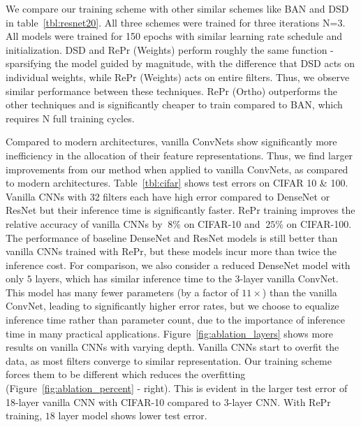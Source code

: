 We compare our training scheme with other similar schemes like BAN and DSD in table~\ref{tbl:resnet20}.
All three schemes were trained for three iterations \ie N=3. 
All models were trained for 150 epochs with similar learning rate schedule and initialization.
DSD and RePr (Weights) perform roughly the same function - sparsifying the model guided by magnitude, with the difference that DSD acts on individual weights, while RePr (Weights) acts on entire filters.
Thus, we observe similar performance between these techniques.
RePr (Ortho) outperforms the other techniques and is significantly cheaper to train compared to BAN, which requires N full training cycles.

Compared to modern architectures, vanilla ConvNets show significantly more inefficiency in the allocation of their feature representations. 
Thus, we find larger improvements from our method when applied to vanilla ConvNets, as compared to modern architectures. 
Table~\ref{tbl:cifar} shows test errors on CIFAR 10 \& 100. 
Vanilla CNNs with 32 filters each have high error compared to DenseNet or ResNet but their inference time is significantly faster. 
RePr training improves the relative accuracy of vanilla CNNs by $~8\%$ on CIFAR-10 and $~25\%$ on CIFAR-100.
The performance of baseline DenseNet and ResNet models is still better than vanilla CNNs trained with RePr, but these models incur more than twice the inference cost.
For comparison, we also consider a reduced DenseNet model with only $5$ layers, which has similar inference time to the 3-layer vanilla ConvNet. 
This model has many fewer parameters (by a factor of $11\times$) than the vanilla ConvNet, leading to significantly higher error rates, but we choose to equalize inference time rather than parameter count, due to the importance of inference time in many practical applications.
Figure~\ref{fig:ablation_layers} shows more results on vanilla CNNs with varying depth.
Vanilla CNNs start to overfit the data, as most filters converge to similar representation.
Our training scheme forces them to be different which reduces the overfitting (Figure~\ref{fig:ablation_percent} - right).
This is evident in the larger test error of 18-layer vanilla CNN with CIFAR-10 compared to 3-layer CNN.
With RePr training, $18$ layer model shows lower test error.

